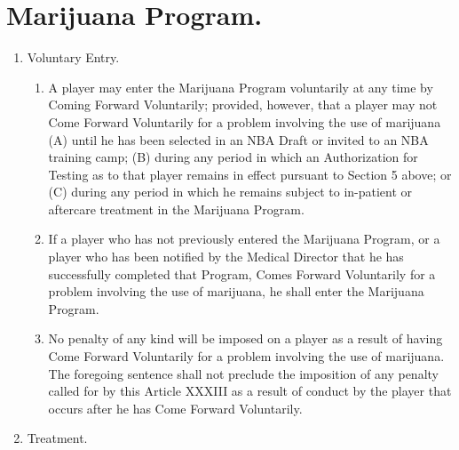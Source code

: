 \documentclass[
]{book}
\providecommand{\tightlist}{%
  \setlength{\itemsep}{0pt}\setlength{\parskip}{0pt}}
\begin{document}
\hypertarget{marijuana-program.}{%
\section{Marijuana Program.}\label{marijuana-program.}}

\begin{enumerate}
\def\labelenumi{(\alph{enumi})}
\item
  Voluntary Entry.

  \begin{enumerate}
  \def\labelenumii{(\roman{enumii})}
  \tightlist
  \item
    A player may enter the Marijuana Program voluntarily at any time by Coming Forward Voluntarily; provided, however, that a player may not Come Forward Voluntarily for a problem involving the use of marijuana (A) until he has been selected in an NBA Draft or invited to an NBA training camp; (B) during any period in which an Authorization for Testing as to that player remains in effect pursuant to Section 5 above; or (C) during any period in which he remains subject to in-patient or aftercare treatment in the Marijuana Program.
  \item
    If a player who has not previously entered the Marijuana Program, or a player who has been notified by the Medical Director that he has successfully completed that Program, Comes Forward Voluntarily for a problem involving the use of marijuana, he shall enter the Marijuana Program.
  \item
    No penalty of any kind will be imposed on a player as a result of having Come Forward Voluntarily for a problem involving the use of marijuana. The foregoing sentence shall not preclude the imposition of any penalty called for by this Article XXXIII as a result of conduct by the player that occurs after he has Come Forward Voluntarily.
  \end{enumerate}
\item
  Treatment.


\end{enumerate}
\end{document}
